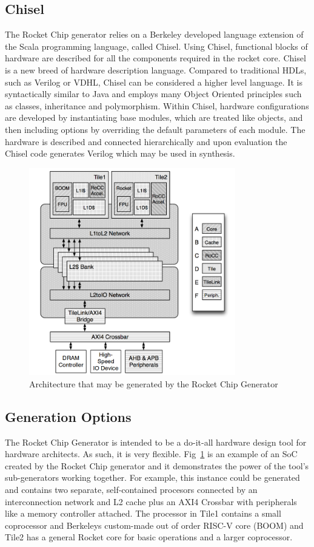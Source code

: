 \documentclass[journal]{IEEEtran}
\begin{document}
\subsection{Chisel}
The Rocket Chip generator relies on a Berkeley developed language extension of the Scala programming language, called Chisel\cite{bachrach2012chisel}. Using Chisel, functional blocks of hardware are described for all the components required in the rocket core. Chisel is a new breed of hardware description language. Compared to traditional HDLs, such as Verilog or VDHL, Chisel can be considered a higher level language. It is syntactically similar to Java and employs many Object Oriented principles such as classes, inheritance and polymorphism. Within Chisel, hardware configurations are developed by instantiating base modules, which are treated like objects, and then including options by overriding the default parameters of each module. The hardware is described and connected hierarchically and upon evaluation the Chisel code generates Verilog which may be used in synthesis.

\begin{figure} %
\centering
\includegraphics[width=9cm ]{./graphics/ExampleRocketChip.png}
\centering
\caption{Architecture that may be generated by the Rocket Chip Generator\cite{Asanović:EECS-2016-17}}
\label{fig:rocketchip}
\end{figure}

\subsection{Generation Options}
The Rocket Chip Generator is intended to be a do-it-all hardware design tool for hardware architects. As such, it is very flexible. Fig~\ref{fig:rocketchip} is an example of an SoC created by the Rocket Chip generator and it demonstrates the power of the tool's sub-generators working together. For example, this instance could be generated and contains two separate, self-contained procesors connected by an interconnection network and L2 cache plus an AXI4 Crossbar with peripherals like a memory controller attached. The processor in Tile1 contains a small coprocessor and Berkeleys custom-made out of order RISC-V core (BOOM) and Tile2 has a general Rocket core for basic operations and a larger coprocessor.
\end{document}
